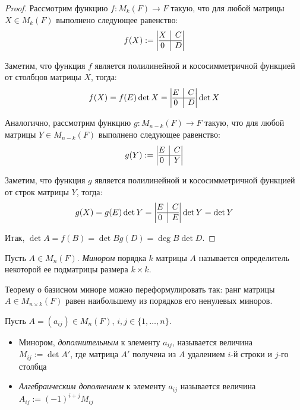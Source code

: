\begin{proof}
	Рассмотрим функцию $f : M_k(F) \rightarrow F$ такую, что для любой матрицы $X \in M_k(F)$ выполнено следующее равенство:
	\[f(X) := \left|\begin{array}{@{}c|c@{}}
	X & C\\
	\hline
	0 & D
	\end{array}\right|\]
	
	Заметим, что функция $f$ является полилинейной и кососимметричной функцией от столбцов матрицы $X$, тогда:
	\[f(X) = f(E)\det{X} = \left|\begin{array}{@{}c|c@{}}
	E & C\\
	\hline
	0 & D
	\end{array}\right|\det{X}\]
	
	Аналогично, рассмотрим функцию $g : M_{n - k}(F) \rightarrow F$ такую, что для любой матрицы $Y \in M_{n-k}(F)$ выполнено следующее равенство:
	\[g(Y) := \left|\begin{array}{@{}c|c@{}}
	E & C\\
	\hline
	0 & Y
	\end{array}\right|\]
	
	Заметим, что функция $g$ является полилинейной и кососимметричной функцией от строк матрицы $Y$, тогда:
	\[g(X) = g(E)\det{Y} = \left|\begin{array}{@{}c|c@{}}
	E & C\\
	\hline
	0 & E
	\end{array}\right|\det{Y} = \det{Y}\]
	
	Итак, $\det{A} = f(B) = \det{B}g(D) = \deg{B}\det{D}$.
\end{proof}

\begin{definition}
	Пусть $A \in M_n(F)$. \textit{Минором} порядка $k$ матрицы $A$ называется определитель некоторой ее подматрицы размера $k \times k$.
\end{definition}

\begin{note}
	Теорему о базисном миноре можно переформулировать так: ранг матрицы $A \in M_{n \times k}(F)$ равен наибольшему из порядков его ненулевых миноров.
\end{note}

\begin{definition}
	Пусть $A = (a_{ij}) \in M_n(F)$, $i, j \in \{1, \dotsc, n\}$.
	\begin{itemize}
		\item Минором, \textit{дополнительным} к элементу $a_{ij}$, называется величина $M_{ij} := \det{A'}$, где матрица $A'$ получена из $A$ удалением $i$-й строки и $j$-го столбца
		\item \textit{Алгебраическим дополнением} к элементу $a_{ij}$ называется величина $A_{ij} := (-1)^{i + j}M_{ij}$
	\end{itemize}
\end{definition}

